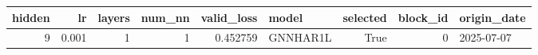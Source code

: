 \begin{tabular}{rrrrrlrrl}
\toprule
hidden & lr & layers & num_nn & valid_loss & model & selected & block_id & origin_date \\
\midrule
9 & 0.001 & 1 & 1 & 0.452759 & GNNHAR1L & True & 0 & 2025-07-07 \\
\bottomrule
\end{tabular}
